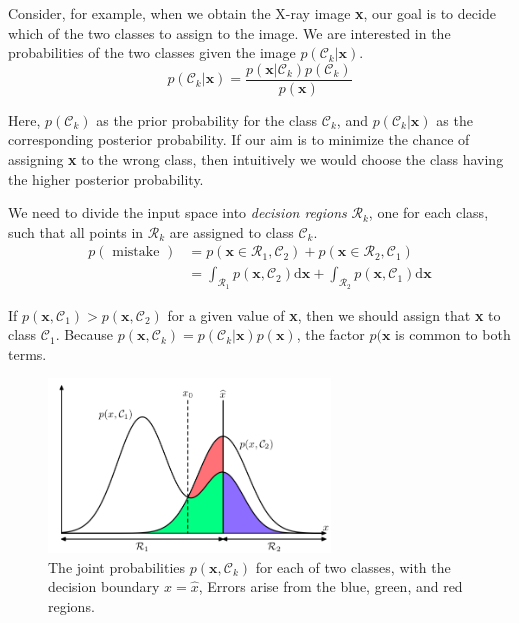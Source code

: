 \documentclass[5p,sort&compress]{elsarticle}
\begin{document}
Consider, for example, when we obtain the X-ray image \textbf{x}, our goal is to decide which of the two classes to assign to the image. We are interested in the probabilities of the two classes given the image $p(\mathcal{C}_k|\textbf{x})$.
\begin{equation}
p\left(\mathcal{C}_{k} | \mathbf{x}\right)=\frac{p\left(\mathbf{x} | \mathcal{C}_{k}\right) p\left(\mathcal{C}_{k}\right)}{p(\mathbf{x})}
\end{equation}

Here, $p(\mathcal{C}_k)$ as the prior probability for the class $\mathcal{C}_k$, and $p(\mathcal{C}_k|\textbf{x})$ as the corresponding posterior probability. If our aim is to minimize the chance of assigning \textbf{x} to the wrong class, then intuitively we would choose the class having the higher posterior probability.

We need to divide the input space into \textit{decision regions} $\mathcal{R}_k$, one for each class, such that all points in $\mathcal{R}_k$ are assigned to class $\mathcal{C}_k$.
\begin{equation}
\begin{aligned} p(\text { mistake }) &=p\left(\mathbf{x} \in \mathcal{R}_{1}, \mathcal{C}_{2}\right)+p\left(\mathbf{x} \in \mathcal{R}_{2}, \mathcal{C}_{1}\right) \\ &=\int_{\mathcal{R}_{1}} p\left(\mathbf{x}, \mathcal{C}_{2}\right) \mathrm{d} \mathbf{x}+\int_{\mathcal{R}_{2}} p\left(\mathbf{x}, \mathcal{C}_{1}\right) \mathrm{d} \mathbf{x} \end{aligned}
\end{equation}

If $p\left(\mathbf{x}, \mathcal{C}_{1}\right) > p\left(\mathbf{x}, \mathcal{C}_{2}\right)$ for a given value of \textbf{x}, then we should assign that \textbf{x} to class $\mathcal{C}_1$. 
Because $p\left(\mathbf{x}, \mathcal{C}_{k}\right)=p\left(\mathcal{C}_{k} | \mathbf{x}\right) p(\mathbf{x})$, the factor $p(\mathbf{x}$ is common to both terms.
\begin{figure}
    \centering
    \includegraphics[width=7.5cm]{figure/decision_boundary.png}
    \caption{The joint probabilities $p\left(\mathbf{x}, \mathcal{C}_{k}\right)$ for each of two classes, with the decision boundary $x=\hat{x}$, Errors arise from the blue, green, and red regions.}
    \label{fig:1.24}
\end{figure}
\end{document}
